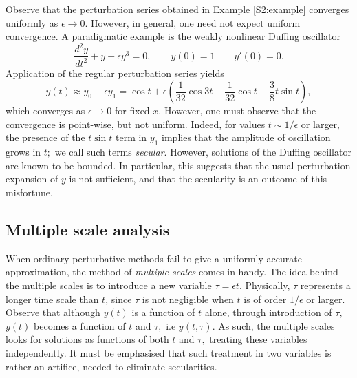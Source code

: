 Observe that the perturbation series obtained in Example \ref{S2:example} converges uniformly as $\epsilon \to 0.$ However, in general, one need not expect uniform convergence. A paradigmatic example is the weakly nonlinear Duffing oscillator
\begin{equation}\label{Duffing}
\frac{d^2 y}{d t^2} + y + \epsilon y^3 = 0, \qquad y(0)=1 \qquad y'(0)=0.
\end{equation}
Application of the regular perturbation series yields
\begin{equation*}
y(t) \approx y_0 + \epsilon y_1 = \cos t + \epsilon\left(\frac{1}{32} \cos 3t -\frac{1}{32} \cos t + \frac{3}{8} t \sin t\right ),
\end{equation*}
which converges as $\epsilon \to 0$ for fixed $x.$ However, one must observe that the convergence is point-wise, but not uniform. Indeed, for values $t \sim 1/\epsilon$ or larger, the presence of the $t \sin t$ term in $y_1$ implies that the amplitude of oscillation grows in $t;$ we call such terms \textit{secular}. However, solutions of the Duffing oscillator are known to be bounded. In particular, this suggests that the usual perturbation expansion of $y$ is not sufficient, and that the secularity is an outcome of this misfortune.

\subsection*{Multiple scale analysis}
When ordinary perturbative methods fail to give a uniformly accurate approximation, the method of \textit{multiple scales} comes in handy. The idea behind the multiple scales is to introduce a new variable $\tau = \epsilon t.$ Physically, $\tau$ represents a longer time scale than $t$, since $\tau$ is not negligible when $t$ is of order $1/\epsilon$ or larger. Observe that although $y(t)$ is a function of $t$ alone, through introduction of $\tau,$ $y(t)$ becomes a function of $t$ and $\tau,$ i.e $y(t, \tau).$ As such, the multiple scales looks for solutions as functions of both $t$ and $\tau,$ treating these variables independently. It must be emphasised that such treatment in two variables is rather an artifice, needed to eliminate secularities.


